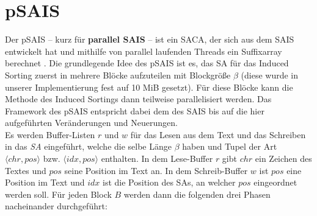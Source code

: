 \section{pSAIS}
\label{section:psais}


Der pSAIS -- kurz für \textbf{parallel SAIS} -- ist ein SACA, der sich aus dem SAIS entwickelt hat und mithilfe von parallel laufenden Threads ein Suffixarray berechnet \cite{psais}. Die grundlegende Idee des pSAIS ist es, das SA für das Induced Sorting zuerst in mehrere Blöcke aufzuteilen mit Blockgröße $\beta$ (diese wurde in unserer Implementierung fest auf 10 MiB gesetzt). Für diese Blöcke kann die Methode des Induced Sortings dann teilweise parallelisiert werden. Das Framework des pSAIS entspricht dabei dem des SAIS bis auf die hier aufgeführten Veränderungen und Neuerungen. \\
Es werden Buffer-Listen $r$ und $w$ für das Lesen aus dem Text und das Schreiben in das \textit{SA}  eingeführt, welche die selbe Länge $\beta$ haben und Tupel der Art $\langle chr, pos \rangle$ bzw. $\langle idx, pos \rangle$ enthalten. In dem Lese-Buffer $r$ gibt $chr$ ein Zeichen des Textes und $pos$ seine Position im Text an. In dem Schreib-Buffer $w$ ist $pos$ eine Position im Text und $idx$ ist die Position des SAs, an welcher $pos$ eingeordnet werden soll. Für jeden Block $B$ werden dann die folgenden drei Phasen nacheinander durchgeführt:

